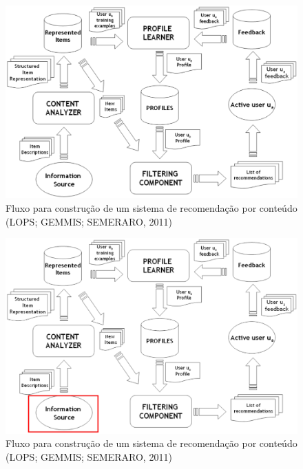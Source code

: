 \begin{frame}

\begin{figure}[h!]
  \centering
    \includegraphics[width=1\textwidth]{figura/recomendacao_conteudo.eps}
  \caption{Fluxo para construção de um sistema de recomendação por conteúdo (LOPS; GEMMIS; SEMERARO, 2011)}
\end{figure}

\end{frame}

\begin{frame}

\begin{figure}[h!]
  \centering
    \includegraphics[width=1\textwidth]{figura/recomendacao_conteudo_1.eps}
  \caption{Fluxo para construção de um sistema de recomendação por conteúdo (LOPS; GEMMIS; SEMERARO, 2011)}
\end{figure}

\end{frame}

